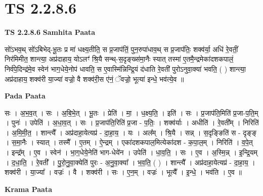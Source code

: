 \documentclass[17pt]{extarticle}
\begin{document}
\section{ TS 2.2.8.6 }

\textbf{TS 2.2.8.6 } \newline
\textbf{Samhita Paata} \newline

सो॑ऽभव॒थ् सो॑ऽबिभेद्-भू॒तः प्र मा॑ धक्ष्य॒तीति॒ स प्र॒जाप॑तिं॒ पुन॒रुपा॑धाव॒थ् स प्र॒जाप॑तिः॒ शक्व॑र्या॒ अधि॑ रे॒वतीं॒ निर॑मिमीत॒ शान्त्या॒ अप्र॑दाहाय॒ योऽलꣳ॑ श्रि॒यै सन्थ्-स॒दृङ्ख्स॑मा॒नैः स्यात् तस्मा॑ ए॒तमै॒न्द्रमेका॑दशकपालं॒ निर्व॑पे॒दिन्द्र॑मे॒व स्वेन॑ भाग॒धेये॒नोप॑ धावति॒ स ए॒वास्मि॑न्निन्द्रि॒यं द॑धाति रे॒वती॑ पुरोऽनुवा॒क्या॑ भवति॒ ( ) शान्त्या॒ अप्र॑दाहाय॒ शक्व॑री या॒ज्या॑ वज्रो॒ वै शक्व॑री॒स ए॑नं॒ ॅवज्रो॒ भूत्या॑ इन्धे॒ भव॑त्ये॒व ॥ \newline

\textbf{Pada Paata} \newline

सः । अ॒भ॒व॒त् । सः । अ॒बि॒भे॒त् । भू॒तः । प्रेति॑ । मा॒ । ध॒क्ष्य॒ति॒ । इति॑ । सः । प्र॒जाप॑ति॒मिति॑ प्र॒जा-प॒ति॒म् । पुनः॑ । उपेति॑ । अ॒धा॒व॒त् । सः । प्र॒जाप॑ति॒रिति॑ प्र॒जा - प॒तिः॒ । शक्व॑र्याः । अधीति॑ । रे॒वती᳚म् । निरिति॑ । अ॒मि॒मी॒त॒ । शान्त्यै᳚ । अप्र॑दाहा॒येत्यप्र॑ - दा॒हा॒य॒ । यः । अल᳚म् । श्रि॒यै । सन्न् । स॒दृङ्ङिति॑ स - दृङ्ङ् । स॒मा॒नैः । स्यात् । तस्मै᳚ । ए॒तम् । ऐ॒न्द्रम् । एका॑दशकपाल॒मित्येका॑दश - क॒पा॒ल॒म् । निरिति॑ । व॒पे॒त् । इन्द्र᳚म् । ए॒व । स्वेन॑ । भा॒ग॒धेये॒नेति॑ भाग-धेये॑न । उपेति॑ । धा॒व॒ति॒ । सः । ए॒व । अ॒स्मि॒न्न् । इ॒न्द्रि॒यम् । द॒धा॒ति॒ । रे॒वती᳚ । पु॒रो॒नु॒वा॒क्येति॑ पुरः - अ॒नु॒वा॒क्या᳚ । भ॒व॒ति॒ ( ) । शान्त्यै᳚ । अप्र॑दाहा॒येत्यप्र॑ - दा॒हा॒य॒ । शक्व॑री । या॒ज्या᳚ । वज्रः॑ । वै । शक्व॑री । सः । ए॒न॒म् । वज्रः॑ । भूत्यै᳚ । इ॒न्धे॒ । भव॑ति । ए॒व ॥  \newline


\textbf{Krama Paata} \newline
\end{document}
